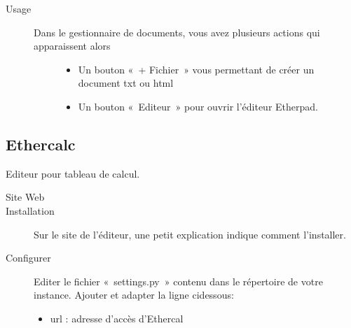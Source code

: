 \documentclass[letterpaper,10pt,french]{sphinxmanual}
\begin{document}
\begin{sphinxVerbatim}[commandchars=\\\{\}]
     
\end{sphinxVerbatim}
\begin{description}
\item[{Usage}] \leavevmode\begin{description}
\item[{Dans le gestionnaire de documents, vous avez plusieurs actions qui apparaissent alors}] \leavevmode\begin{itemize}
\item {} 
Un bouton « + Fichier » vous permettant de créer un document txt ou html

\item {} 
Un bouton « Editeur » pour ouvrir l’éditeur Etherpad.

\end{itemize}

\end{description}

\end{description}

\noindent{}


\subsection{Ethercalc}
\label{\detokenize{documents/editor:ethercalc}}
Editeur pour tableau de calcul.
\begin{description}
\item[{Site Web}] \leavevmode
{}

\item[{Installation}] \leavevmode
Sur le site de l’éditeur, une petit explication indique comment l’installer.

\item[{Configurer}] \leavevmode
Editer le fichier « settings.py » contenu dans le répertoire de votre instance.
Ajouter et adapter la ligne ci\sphinxhyphen{}dessous:
\begin{itemize}
\item {} 
url : adresse d’accès d’Ethercal

\end{itemize}

\end{description}
\end{document}
